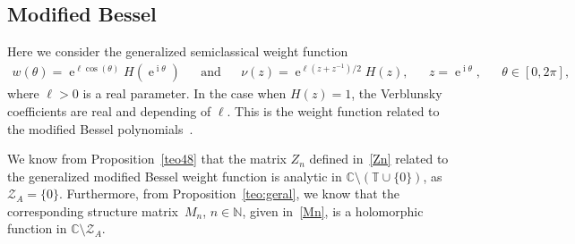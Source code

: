 \documentclass[12pt]{amsart}
\newcommand{\dde}{\operatorname e}
\newcommand{\ddi}{\operatorname i}
\begin{document}
\subsection{Modified Bessel}

Here we consider the generalized semiclassical weight function 
\begin{align*}
w(\theta ) = 
 \dde ^{\ell \cos(\theta )} H ( \dde^{\ddi \theta})&& \mbox{and} &&
\nu(z) = 
\dde^{\ell (z+z^{-1})/2} H (z), && z=\dde^{\ddi \theta}, && \theta \in[0,2\pi],
\end{align*}
\noindent where \( \ell>0 \) is a real parameter. In the case when \( H (z) = 1 \), the Verblunsky coefficients are real and depending of \( \ell \). This is the weight function related to the modified Bessel polynomials~\cite{Is05}. 


We know from Proposition~\ref{teo48} that the matrix \( Z_n \) defined in~\eqref{Zn} related to the generalized modified Bessel weight function is analytic in \( \mathbb C \setminus (\mathbb T \cup \{ 0 \}) \), as \( \mathcal Z_A = \{ 0 \} \).
Furthermore, from Proposition~\ref{teo:geral}, we know that the corresponding structure matrix~\( M_n \), \( n\in\mathbb{N} \), given in~\eqref{Mn}, is a holomorphic function in \( \mathbb {C} \setminus \mathcal{Z}_A \).
\end{document}
